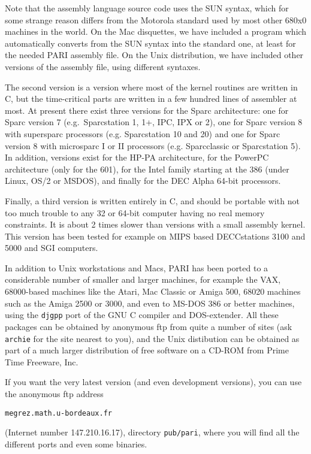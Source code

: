 Note that the assembly language source code uses the SUN syntax,
which for some strange reason differs from the Motorola standard used by
most other 680x0 machines in the world. On the Mac disquettes, we have
included a program which automatically converts
from the SUN syntax into the standard one, at least for the needed PARI
assembly file. On the Unix distribution, we have included other versions
of the assembly file, using different syntaxes. 

The second version is a version where most of the kernel routines are written
in C, but the time-critical parts are written in a few hundred lines
of assembler at most. At present there exist three versions for the Sparc 
architecture: one for Sparc version 7 (e.g.~Sparcstation 1, 1+, IPC, IPX or 2),
one for Sparc version 8 with supersparc processors (e.g. Sparcstation 10
and 20) and one for Sparc version 8 with microsparc I or II processors
(e.g. Sparcclassic or Sparcstation 5). In addition, versions exist for
the HP-PA architecture, for the PowerPC architecture (only for the 601),
for the Intel family starting at the 386 (under Linux, OS/2 or MSDOS), and
finally for the DEC Alpha 64-bit processors.

Finally, a third version is written entirely in C, and should be portable with
not too much trouble to any 32 or 64-bit computer having no real memory
constraints. It is about 2 times slower than versions with a small assembly
kernel. This version has been tested for example on MIPS based DECCstations 
3100 and 5000 and SGI computers. 

In addition to Unix workstations and Macs, PARI has been ported to a 
considerable number of smaller and larger machines, for example the VAX,
68000-based machines like the Atari, Mac Classic or Amiga 500, 68020 machines
such as the Amiga 2500 or 3000, and even to MS-DOS 386 or better machines, 
using the {\tt djgpp} port of the GNU C compiler and DOS-extender.
\smallskip
All these packages can be obtained by anonymous ftp from quite a number
of sites (ask {\tt archie} for the site nearest to you), and the Unix
distibution can be obtained as part of a much larger distribution of
free software on a CD-ROM from Prime Time Freeware, Inc.

If you want the very latest version (and even development versions),
you can use the anonymous ftp address

{\tt megrez.math.u-bordeaux.fr} 

(Internet number 147.210.16.17), directory {\tt pub/pari}, where you
will find all the different ports and even some binaries.


